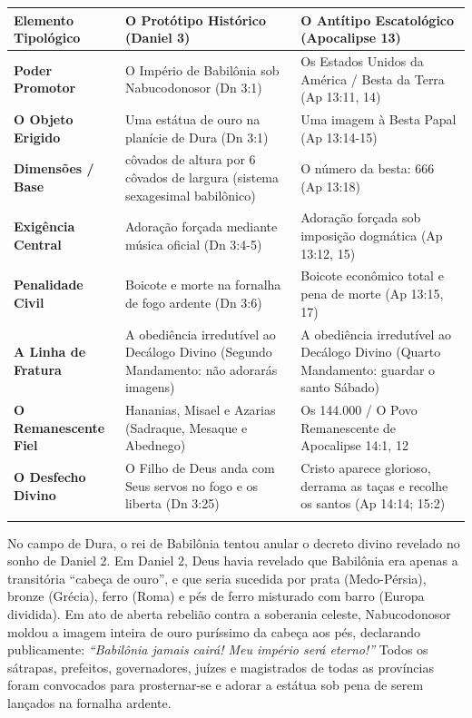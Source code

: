 \documentclass[11pt,a4paper,openany]{book}
\begin{document}
\begin{table}[htbp]
\centering
\footnotesize
\setlength{\tabcolsep}{5pt}
\renewcommand{\arraystretch}{1.25}
\begin{tabularx}{\textwidth}{>{\raggedright\arraybackslash}p{} >{\raggedright\arraybackslash}X >{\raggedright\arraybackslash}X}
\toprule
\textbf{Elemento Tipológico} & \textbf{O Protótipo Histórico (Daniel 3)} & \textbf{O Antítipo Escatológico (Apocalipse 13)} \\
\midrule
\textbf{Poder Promotor} & O Império de Babilônia sob Nabucodonosor (Dn 3:1) & Os Estados Unidos da América / Besta da Terra (Ap 13:11, 14) \\
\addlinespace[3pt]
\textbf{O Objeto Erigido} & Uma estátua de ouro na planície de Dura (Dn 3:1) & Uma imagem à Besta Papal (Ap 13:14-15) \\
\addlinespace[3pt]
\textbf{Dimensões / Base} & 60 côvados de altura por 6 côvados de largura (sistema sexagesimal babilônico) & O número da besta: 666 (Ap 13:18) \\
\addlinespace[3pt]
\textbf{Exigência Central} & Adoração forçada mediante música oficial (Dn 3:4-5) & Adoração forçada sob imposição dogmática (Ap 13:12, 15) \\
\addlinespace[3pt]
\textbf{Penalidade Civil} & Boicote e morte na fornalha de fogo ardente (Dn 3:6) & Boicote econômico total e pena de morte (Ap 13:15, 17) \\
\addlinespace[3pt]
\textbf{A Linha de Fratura} & A obediência irredutível ao Decálogo Divino (Segundo Mandamento: não adorarás imagens) & A obediência irredutível ao Decálogo Divino (Quarto Mandamento: guardar o santo Sábado) \\
\addlinespace[3pt]
\textbf{O Remanescente Fiel} & Hananias, Misael e Azarias (Sadraque, Mesaque e Abednego) & Os 144.000 / O Povo Remanescente de Apocalipse 14:1, 12 \\
\addlinespace[3pt]
\textbf{O Desfecho Divino} & O Filho de Deus anda com Seus servos no fogo e os liberta (Dn 3:25) & Cristo aparece glorioso, derrama as taças e recolhe os santos (Ap 14:14; 15:2) \\
\addlinespace[3pt]
\bottomrule
\end{tabularx}
\end{table}


No campo de Dura, o rei de Babilônia tentou anular o decreto divino revelado no sonho de Daniel 2. Em Daniel 2, Deus havia revelado que Babilônia era apenas a transitória ``cabeça de ouro'', e que seria sucedida por prata (Medo-Pérsia), bronze (Grécia), ferro (Roma) e pés de ferro misturado com barro (Europa dividida). Em ato de aberta rebelião contra a soberania celeste, Nabucodonosor moldou a imagem inteira de ouro puríssimo da cabeça aos pés, declarando publicamente: \textit{``Babilônia jamais cairá! Meu império será eterno!''} Todos os sátrapas, prefeitos, governadores, juízes e magistrados de todas as províncias foram convocados para prosternar-se e adorar a estátua sob pena de serem lançados na fornalha ardente.
\end{document}
